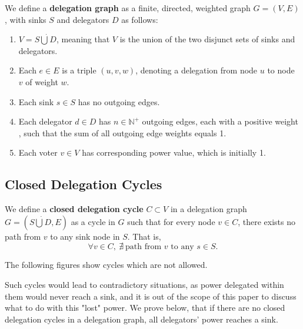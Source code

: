 We define a \textbf{delegation graph} as a finite, directed, weighted graph $G = (V, E)$, with sinks $S$ and delegators $D$ as follows:

\begin{enumerate}
\item $V = S \dot\bigcup D$, meaning that $V$ is the union of the two disjunct sets of sinks and delegators.
\item Each $e \in E$ is a triple $(u, v, w)$, denoting a delegation from node $u$ to node $v$ of weight $w$.
\item Each sink $s \in S$ has no outgoing edges.
\item Each delegator $d \in D$ has $n \in \mathbb{N}^+$ outgoing edges, each with a positive weight \footnotemark, such that the sum of all outgoing edge weights equals 1.
\item Each voter $v \in V$ has corresponding power value, which is initially 1.
\end{enumerate}

\subsection{Closed Delegation Cycles}


We define a \textbf{closed delegation cycle} $C \subset V$ in a delegation graph $G = (S \dot\bigcup D, E)$ as a cycle in $G$ such that for every node $v \in C$, there exists no path from $v$ to any sink node in $S$. That is,
\[
\forall v \in C,\ \nexists\ \text{path from } v \text{ to any } s \in S.
\]

The following figures show cycles which are not allowed.


Such cycles would lead to contradictory situations, as power delegated within them would never reach a sink, and it is out of the scope of this paper to discuss what to do with this "lost" power. We prove below, that if there are no closed delegation cycles in a delegation graph, all delegators' power reaches a sink.

 \\

